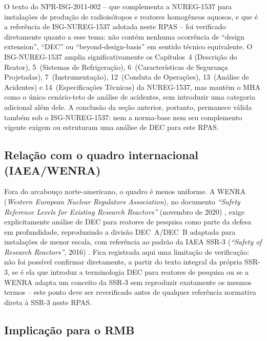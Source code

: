 O texto do NPR-ISG-2011-002 -- que complementa a NUREG-1537 para
instala\c{c}\~oes de produ\c{c}\~ao de radiois\'otopos e reatores
homog\^eneos aquosos, e que \'e a refer\^encia de ISG-NUREG-1537 adotada neste
RPAS -- foi verificado diretamente quanto a esse tema: n\~ao cont\'em
nenhuma ocorr\^encia de ``design extension'', ``DEC'' ou
``beyond-design-basis'' em sentido t\'ecnico equivalente. O ISG-NUREG-1537
amplia significativamente os Cap\'itulos~4 (Descri\c{c}\~ao do Reator),
5~(Sistemas de Refrigera\c{c}\~ao), 6~(Caracter\'isticas de Seguran\c{c}a
Projetadas), 7~(Instrumenta\c{c}\~ao), 12~(Conduta de Opera\c{c}\~oes),
13~(An\'alise de Acidentes) e 14~(Especifica\c{c}\~oes T\'ecnicas) da
NUREG-1537, mas mant\'em o MHA como o \'unico cen\'ario-teto de an\'alise
de acidentes, sem introduzir uma categoria adicional al\'em dele. A
conclus\~ao da se\c{c}\~ao anterior, portanto, permanece v\'alida tamb\'em
sob o ISG-NUREG-1537: nem a norma-base nem seu complemento vigente exigem ou
estruturam uma an\'alise de DEC para este RPAS.

\subsection*{Rela\c{c}\~ao com o quadro internacional (IAEA/WENRA)}

Fora do arcabou\c{c}o norte-americano, o quadro \'e menos uniforme. A
WENRA (\emph{Western European Nuclear Regulators Association}), no
documento \emph{``Safety Reference Levels for Existing Research
Reactors''} (novembro de 2020) \citep{wenrasrl2020}, exige explicitamente an\'alise de DEC
para reatores de pesquisa como parte da defesa em profundidade,
reproduzindo a divis\~ao DEC~A/DEC~B adaptada para instala\c{c}\~oes de
menor escala, com refer\^encia ao padr\~ao da IAEA SSR-3 (\emph{``Safety
of Research Reactors''}, 2016) \citep{iaeassr3}. Fica registrada aqui uma limita\c{c}\~ao
de verifica\c{c}\~ao: n\~ao foi poss\'ivel confirmar diretamente, a partir
do texto integral da pr\'opria SSR-3, se \'e ela que introduz a
terminologia DEC para reatores de pesquisa ou se a WENRA adapta um
conceito da SSR-3 sem reproduzir exatamente os mesmos termos -- este
ponto deve ser reverificado antes de qualquer refer\^encia normativa
direta \`a SSR-3 neste RPAS.

\subsection*{Implica\c{c}\~ao para o RMB}

